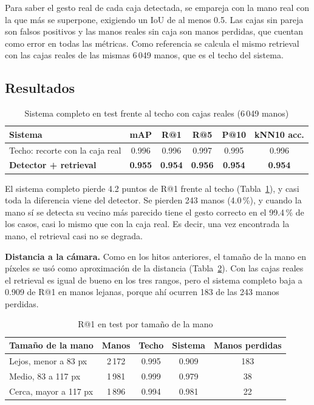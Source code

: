\documentclass[11pt,letterpaper]{article}
\newcommand{\fuente}[1]{\par\vspace{2pt}{\footnotesize Fuente: #1}}
\begin{document}
Para saber el gesto real de cada caja detectada, se empareja con la mano real con la que más se
superpone, exigiendo un IoU de al menos 0.5. Las cajas sin pareja son falsos positivos y las manos
reales sin caja son manos perdidas, que cuentan como error en todas las métricas. Como referencia
se calcula el mismo retrieval con las cajas reales de las mismas 6\,049 manos, que es el techo del
sistema.

\subsection{Resultados}

\begin{table}[!htb]
\centering
\caption{Sistema completo en test frente al techo con cajas reales (6\,049 manos)}
\label{tab:sistema}
\begin{tabular}{lccccc}
\toprule
Sistema & mAP & R@1 & R@5 & P@10 & kNN10 acc. \\
\midrule
Techo: recorte con la caja real & 0.996 & 0.996 & 0.997 & 0.995 & 0.996 \\
\textbf{Detector + retrieval} & \textbf{0.955} & \textbf{0.954} & \textbf{0.956} & \textbf{0.954} & \textbf{0.954} \\
\bottomrule
\end{tabular}
\fuente{Elaboración propia.}
\end{table}

El sistema completo pierde 4.2 puntos de R@1 frente al techo (Tabla~\ref{tab:sistema}), y casi toda
la diferencia viene del detector. Se pierden 243 manos (4.0\,\%), y cuando la mano sí se detecta su
vecino más parecido tiene el gesto correcto en el 99.4\,\% de los casos, casi lo mismo que con la
caja real. Es decir, una vez encontrada la mano, el retrieval casi no se degrada.

\textbf{Distancia a la cámara.} Como en los hitos anteriores, el tamaño de la mano en píxeles se usó
como aproximación de la distancia (Tabla~\ref{tab:tamano}). Con las cajas reales el retrieval es
igual de bueno en los tres rangos, pero el sistema completo baja a 0.909 de R@1 en manos lejanas,
porque ahí ocurren 183 de las 243 manos perdidas.

\begin{table}[!htb]
\centering
\caption{R@1 en test por tamaño de la mano}
\label{tab:tamano}
\begin{tabular}{lcccc}
\toprule
Tamaño de la mano & Manos & Techo & Sistema & Manos perdidas \\
\midrule
Lejos, menor a 83 px & 2\,172 & 0.995 & 0.909 & 183 \\
Medio, 83 a 117 px & 1\,981 & 0.999 & 0.979 & 38 \\
Cerca, mayor a 117 px & 1\,896 & 0.994 & 0.981 & 22 \\
\bottomrule
\end{tabular}
\fuente{Elaboración propia.}
\end{table}
\end{document}
